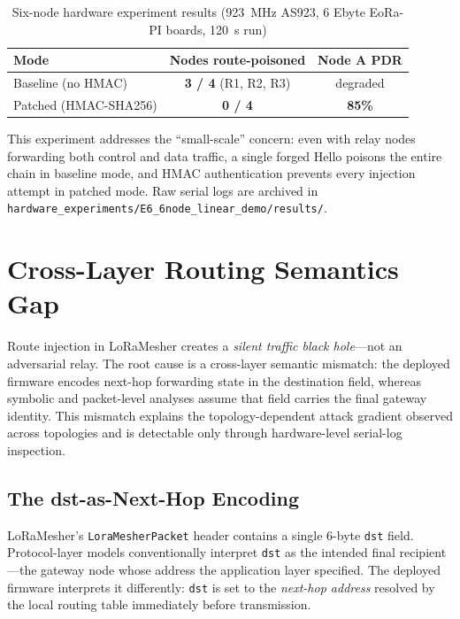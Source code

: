 \documentclass[preprint,12pt]{elsarticle}
\begin{document}
\begin{table}[h]
  \centering
  \caption{Six-node hardware experiment results (923~MHz AS923, 6
           Ebyte EoRa-PI boards, 120~s run)}
  \label{tab:hw-e6}
  \begin{tabular}{lcc}
    \toprule
    \textbf{Mode} & \textbf{Nodes route-poisoned} & \textbf{Node A PDR} \\
    \midrule
    Baseline (no HMAC)   & \textbf{3 / 4} (R1, R2, R3)  & degraded \\
    Patched (HMAC-SHA256) & \textbf{0 / 4}               & \textbf{85\%} \\
    \bottomrule
  \end{tabular}
\end{table}

This experiment addresses the ``small-scale'' concern:
even with relay nodes forwarding both control and data traffic,
a single forged Hello poisons the entire chain in baseline mode,
and HMAC authentication prevents every injection attempt in
patched mode.
Raw serial logs are archived in
\texttt{hardware\_experiments/E6\_6node\_linear\_demo/results/}.

\section{Cross-Layer Routing Semantics Gap}
\label{sec:cross-layer}

Route injection in LoRaMesher creates a \emph{silent traffic
black hole}---not an adversarial relay.
The root cause is a cross-layer semantic mismatch: the deployed
firmware encodes next-hop forwarding state in the destination
field, whereas symbolic and packet-level analyses assume that
field carries the final gateway identity.
This mismatch explains the topology-dependent attack gradient
observed across topologies and is detectable only through
hardware-level serial-log inspection.

\subsection{The dst-as-Next-Hop Encoding}
\label{sec:cross-layer-encoding}

LoRaMesher's \texttt{LoraMesherPacket} header contains a single
6-byte \texttt{dst} field. Protocol-layer models conventionally
interpret \texttt{dst} as the intended final recipient—the
gateway node whose address the application layer specified.
The deployed firmware interprets it differently: \texttt{dst} is
set to the \emph{next-hop address} resolved by the local routing
table immediately before transmission.
\end{document}
